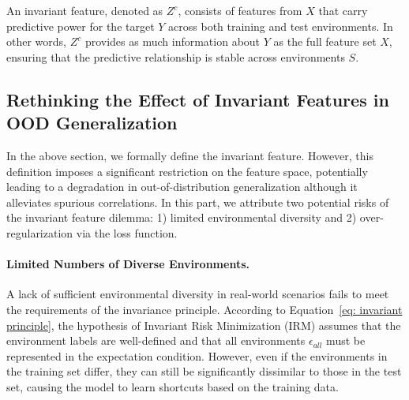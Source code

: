 An invariant feature, denoted as \( Z^c \), consists of features from \( X \) that carry predictive power for the target \( Y \) across both training and test environments. 
In other words, \( Z^c \) provides as much information about \( Y \) as the full feature set \( X \), ensuring that the predictive relationship is stable across environments $S$.



\subsection{Rethinking the Effect of Invariant Features in OOD Generalization}
\label{subsec: reason of il}
In the above section, we formally define the invariant feature. 
However, this definition imposes a significant restriction on the feature space, potentially leading to a degradation in out-of-distribution generalization although it alleviates spurious correlations.
In this part, we attribute two potential risks of the invariant feature dilemma: 1) limited environmental diversity and 2) over-regularization via the loss function. 

\paragraph{Limited Numbers of Diverse Environments.}
A lack of sufficient environmental diversity in real-world scenarios fails to meet the requirements of the invariance principle. According to Equation~\ref{eq: invariant principle}, the hypothesis of Invariant Risk Minimization (IRM) assumes that the environment labels are well-defined and that all environments $\epsilon_{all}$ must be represented in the expectation condition. 
However, even if the environments in the training set differ, they can still be significantly dissimilar to those in the test set, causing the model to learn shortcuts based on the training data.


